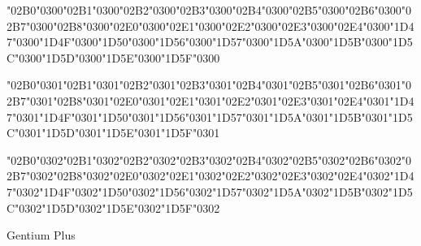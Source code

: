 \documentclass[landscape]{article}
\newcommand{\gs}{\hspace{0.5mm}}	%
\begin{document}
{\char"02B0\char"0300\gs \char"02B1\char"0300\gs \char"02B2\char"0300\gs \char"02B3\char"0300\gs \char"02B4\char"0300\gs \char"02B5\char"0300\gs \char"02B6\char"0300\gs \char"02B7\char"0300\gs \char"02B8\char"0300\gs \char"02E0\char"0300\gs \char"02E1\char"0300\gs \char"02E2\char"0300\gs \char"02E3\char"0300\gs \char"02E4\char"0300\gs \char"1D47\char"0300\gs \char"1D4F\char"0300\gs \char"1D50\char"0300\gs \char"1D56\char"0300\gs \char"1D57\char"0300\gs \char"1D5A\char"0300\gs \char"1D5B\char"0300\gs \char"1D5C\char"0300\gs \char"1D5D\char"0300\gs \char"1D5E\char"0300\gs \char"1D5F\char"0300

\char"02B0\char"0301\gs \char"02B1\char"0301\gs \char"02B2\char"0301\gs \char"02B3\char"0301\gs \char"02B4\char"0301\gs \char"02B5\char"0301\gs \char"02B6\char"0301\gs \char"02B7\char"0301\gs \char"02B8\char"0301\gs \char"02E0\char"0301\gs \char"02E1\char"0301\gs \char"02E2\char"0301\gs \char"02E3\char"0301\gs \char"02E4\char"0301\gs \char"1D47\char"0301\gs \char"1D4F\char"0301\gs \char"1D50\char"0301\gs \char"1D56\char"0301\gs \char"1D57\char"0301\gs \char"1D5A\char"0301\gs \char"1D5B\char"0301\gs \char"1D5C\char"0301\gs \char"1D5D\char"0301\gs \char"1D5E\char"0301\gs \char"1D5F\char"0301

\char"02B0\char"0302\gs \char"02B1\char"0302\gs \char"02B2\char"0302\gs \char"02B3\char"0302\gs \char"02B4\char"0302\gs \char"02B5\char"0302\gs \char"02B6\char"0302\gs \char"02B7\char"0302\gs \char"02B8\char"0302\gs \char"02E0\char"0302\gs \char"02E1\char"0302\gs \char"02E2\char"0302\gs \char"02E3\char"0302\gs \char"02E4\char"0302\gs \char"1D47\char"0302\gs \char"1D4F\char"0302\gs \char"1D50\char"0302\gs \char"1D56\char"0302\gs \char"1D57\char"0302\gs \char"1D5A\char"0302\gs \char"1D5B\char"0302\gs \char"1D5C\char"0302\gs \char"1D5D\char"0302\gs \char"1D5E\char"0302\gs \char"1D5F\char"0302
}

Gentium Plus
\end{document}
